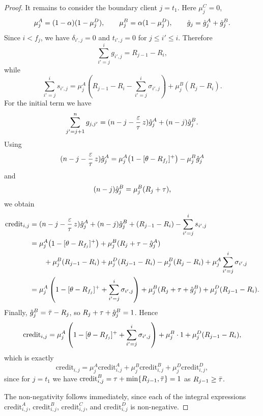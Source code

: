 \begin{proof}
    It remains to consider the boundary client $j=t_1$. Here $\mu_j^C=0$,
    \begin{equation*}
        \mu_j^A=(1-\alpha)(1-\mu_j^D),
        \qquad
        \mu_j^B=\alpha(1-\mu_j^D),
        \qquad
        \hat{g}_j=\hat{g}_j^A+\hat{g}_j^B.
    \end{equation*}
    Since $i<f_j$, we have $\delta_{i',j}=0$ and $t_{i',j}=0$ for $j\le i'\le i$. Therefore
    \begin{equation*}
        \sum_{i'=j}^{i} g_{i',j}=R_{j-1}-R_i,
    \end{equation*}
    while
    \begin{equation*}
        \sum_{i'=j}^{i} s_{i',j}
        =\mu_j^A\left(R_{j-1}-R_i-\sum_{i'=j}^{i}\sigma_{i',j}\right)
        +\mu_j^B(R_j-R_i).
    \end{equation*}
    For the initial term we have
    \begin{equation*}
        \sum_{j'=j+1}^{n} g_{j,j'}=(n-j-\frac{\varepsilon}{\tau}\, z)\hat{g}_j^A+(n-j)\hat{g}_j^B.
    \end{equation*}
    Using
    \begin{equation*}
        (n-j-\frac{\varepsilon}{\tau}\, z)\hat{g}_j^A=
        \mu_j^A\bigl(1-[\theta-R_{f_j}]^+\bigr)-\mu_j^B\hat{g}_j^A
    \end{equation*}
    and
    \begin{equation*}
        (n-j)\hat{g}_j^B=
        \mu_j^B(R_j+\tau),
    \end{equation*}
    we obtain
    \begin{align*}
        \text{credit}_{i,j}
        &= (n-j-\frac{\varepsilon}{\tau}\, z)\hat{g}_j^A+(n-j)\hat{g}_j^B + (R_{j-1}-R_i) - \sum_{i'=j}^{i} s_{i',j} \\
        &= \mu_j^A\bigl(1-[\theta-R_{f_j}]^+\bigr) + \mu_j^B(R_j+\tau-\hat{g}_j^A) \\
        &\qquad + \mu_j^B(R_{j-1}-R_i) + \mu_j^D(R_{j-1}-R_i) - \mu_j^B(R_j-R_i) + \mu_j^A\sum_{i'=j}^{i}\sigma_{i',j} \\
        &= \mu_j^A\left(1-[\theta-R_{f_j}]^+ + \sum_{i'=j}^{i}\sigma_{i',j}\right)
        + \mu_j^B(R_j+\tau+\hat{g}_j^B)
        + \mu_j^D(R_{j-1}-R_i).
    \end{align*}
    Finally, $\hat{g}_j^B=\bar\tau - R_j$, so $R_j+\tau+\hat{g}_j^B=1$. Hence
    \begin{equation*}
        \text{credit}_{i,j}
        = \mu_j^A\left(1-[\theta-R_{f_j}]^+ + \sum_{i'=j}^{i}\sigma_{i',j}\right)
        + \mu_j^B\cdot 1
        + \mu_j^D(R_{j-1}-R_i),
    \end{equation*}
    which is exactly
    \begin{equation*}
        \text{credit}_{i,j}
        = \mu_j^A\text{credit}_{i,j}^A
        + \mu_j^B\text{credit}_{i,j}^B
        + \mu_j^D\text{credit}_{i,j}^D,
    \end{equation*}
    since for $j=t_1$ we have $\text{credit}_{i,j}^B=\tau+\min\{R_{j-1},\bar\tau\}=1$ as $R_{j-1}\geq \bar\tau$.

    The non-negativity follows immediately, since each of the integral expressions $\text{credit}_{i,j}^A$, $\text{credit}_{i,j}^B$, $\text{credit}_{i,j}^C$, and $\text{credit}_{i,j}^D$ is non-negative.
\end{proof}

